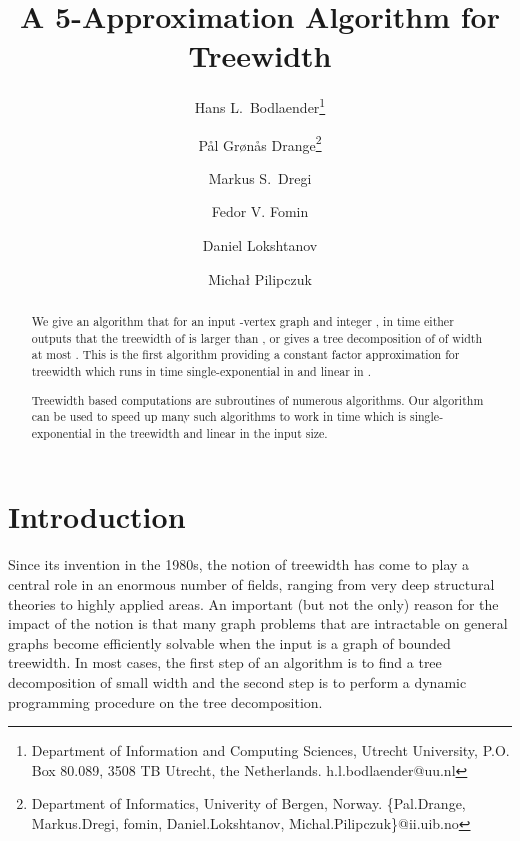 \documentclass[a4paper,11pt]{article}
\theoremstyle{definition}
\theoremstyle{remark}
\begin{document}
\title{A  5-Approximation Algorithm for Treewidth}
\author{
  Hans L.\ Bodlaender\thanks{Department of Information and
    Computing Sciences, Utrecht University, P.O. Box 80.089, 3508 TB
    Utrecht, the Netherlands.  {h.l.bodlaender@uu.nl}}
  \and 
  Pål Grønås Drange\thanks{Department of Informatics, Univerity of
    Bergen, Norway.  \{Pal.Drange, Markus.Dregi, fomin,
      Daniel.Lokshtanov, Michal.Pilipczuk\}@ii.uib.no}
  \and
  Markus S.\ Dregi\footnotemark[2]
  \and
  Fedor V. Fomin\footnotemark[2]
  \and
  Daniel Lokshtanov\footnotemark[2]
  \and
  Micha\l{} Pilipczuk\footnotemark[2]}

\maketitle

\begin{abstract}
  We give an algorithm that for an input -vertex graph  and
  integer , in time  either outputs that the
  treewidth of  is larger than , or gives a tree decomposition
  of  of width at most .  This is the first algorithm
  providing a constant factor approximation for treewidth which runs
  in time single-exponential in  and linear in .
  
  Treewidth based computations are subroutines of numerous algorithms.
  Our algorithm can be used to speed up many such algorithms to work
  in time which is single-exponential in the treewidth and linear in
  the input size.
\end{abstract}

\section{Introduction}
\label{section:introduction}
Since its invention in the 1980s, the notion of treewidth has come to
play a central role in an enormous number of fields, ranging from very
deep structural theories to highly applied areas.  An important (but
not the only) reason for the impact of the notion is that many graph
problems that are intractable on general graphs become efficiently
solvable when the input is a graph of bounded treewidth.  In most
cases, the first step of an algorithm is to find a tree decomposition
of small width and the second step is to perform a dynamic programming
procedure on the tree decomposition.
\end{document}
